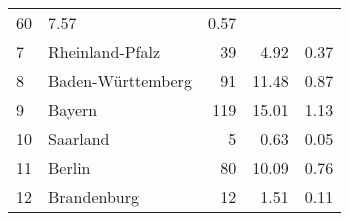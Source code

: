 \begin{longtable}{lXrrr}
       \num{60} &
       \num[round-mode=places,round-precision=2]{7,57} &
         \num[round-mode=places,round-precision=2]{0,57} \\

     7 &
     \multicolumn{1}{X}{ Rheinland-Pfalz   } &


       \num{39} &
       \num[round-mode=places,round-precision=2]{4,92} &
         \num[round-mode=places,round-precision=2]{0,37} \\

     8 &
     \multicolumn{1}{X}{ Baden-Württemberg   } &


       \num{91} &
       \num[round-mode=places,round-precision=2]{11,48} &
         \num[round-mode=places,round-precision=2]{0,87} \\

     9 &
     \multicolumn{1}{X}{ Bayern   } &


       \num{119} &
       \num[round-mode=places,round-precision=2]{15,01} &
         \num[round-mode=places,round-precision=2]{1,13} \\

     10 &
     \multicolumn{1}{X}{ Saarland   } &


       \num{5} &
       \num[round-mode=places,round-precision=2]{0,63} &
         \num[round-mode=places,round-precision=2]{0,05} \\

     11 &
     \multicolumn{1}{X}{ Berlin   } &


       \num{80} &
       \num[round-mode=places,round-precision=2]{10,09} &
         \num[round-mode=places,round-precision=2]{0,76} \\

     12 &
     \multicolumn{1}{X}{ Brandenburg   } &


       \num{12} &
       \num[round-mode=places,round-precision=2]{1,51} &
         \num[round-mode=places,round-precision=2]{0,11} \\


\end{longtable}
